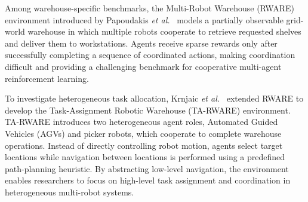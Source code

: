 Among warehouse-specific benchmarks, the Multi-Robot Warehouse (RWARE) environment introduced by Papoudakis \textit{et al.}~\cite{papoudakis2021benchmarking} models a partially observable grid-world warehouse in which multiple robots cooperate to retrieve requested shelves and deliver them to workstations. Agents receive sparse rewards only after successfully completing a sequence of coordinated actions, making coordination difficult and providing a challenging benchmark for cooperative multi-agent reinforcement learning.

To investigate heterogeneous task allocation, Krnjaic \textit{et al.}~\cite{krnjaic2024warehouse} extended RWARE to develop the Task-Assignment Robotic Warehouse (TA-RWARE) environment. TA-RWARE introduces two heterogeneous agent roles, Automated Guided Vehicles (AGVs) and picker robots, which cooperate to complete warehouse operations. Instead of directly controlling robot motion, agents select target locations while navigation between locations is performed using a predefined path-planning heuristic. By abstracting low-level navigation, the environment enables researchers to focus on high-level task assignment and coordination in heterogeneous multi-robot systems.
